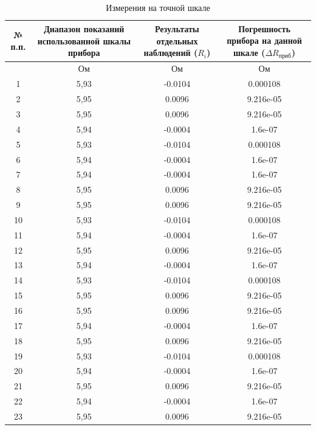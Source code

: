 \begin{longtable}{|c|c|c|c|}
\caption{Измерения на точной шкале}
\label{tabl:2}
\hline
\begin{minipage}{7mm}
    № п.п. 
\end{minipage}&
\begin{minipage}{5cm}
    Диапазон показаний использованной шкалы прибора
\end{minipage} &
\begin{minipage}{5cm}
    Результаты отдельных наблюдений ($R_i$)
\end{minipage} &
\begin{minipage}{5cm}
    Погрешность прибора на данной шкале ($\Delta R_{\text{приб}}$)
\end{minipage}\\
\hline
{}&Ом&Ом&Ом\\
\hline
1 & 5,93 & -0.0104 & 0.000108 \\  
2 & 5,95 & 0.0096 & 9.216e-05 \\  
3 & 5,95 & 0.0096 & 9.216e-05 \\  
4 & 5,94 & -0.0004 & 1.6e-07 \\  
5 & 5,93 & -0.0104 & 0.000108 \\  
6 & 5,94 & -0.0004 & 1.6e-07 \\  
7 & 5,94 & -0.0004 & 1.6e-07 \\  
8 & 5,95 & 0.0096 & 9.216e-05 \\  
9 & 5,95 & 0.0096 & 9.216e-05 \\  
10 & 5,93 & -0.0104 & 0.000108 \\  
11 & 5,94 & -0.0004 & 1.6e-07 \\  
12 & 5,95 & 0.0096 & 9.216e-05 \\  
13 & 5,94 & -0.0004 & 1.6e-07 \\  
14 & 5,93 & -0.0104 & 0.000108 \\  
15 & 5,95 & 0.0096 & 9.216e-05 \\  
16 & 5,95 & 0.0096 & 9.216e-05 \\  
17 & 5,94 & -0.0004 & 1.6e-07 \\  
18 & 5,95 & 0.0096 & 9.216e-05 \\  
19 & 5,93 & -0.0104 & 0.000108 \\  
20 & 5,94 & -0.0004 & 1.6e-07 \\  
21 & 5,95 & 0.0096 & 9.216e-05 \\  
22 & 5,94 & -0.0004 & 1.6e-07 \\  
23 & 5,95 & 0.0096 & 9.216e-05 \\  

\end{longtable}
